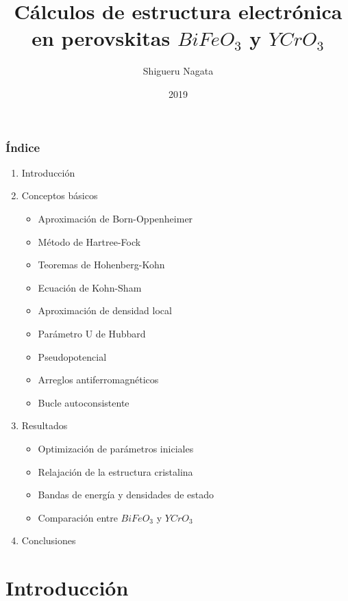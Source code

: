 \documentclass[xcolor=dvipsnames]{beamer}
\author{Shigueru Nagata }
\date{2019}
\title{C\'alculos de estructura electr\'onica en perovskitas $BiFeO_{3}$ y 
$YCrO_{3}$}
\institute{Universidad Nacional de Ingenier\'ia \\ Facultad de ciencias}
\begin{document}
    
    \begin{frame}
        \titlepage
    \end{frame}


\begin{frame}
    \frametitle{\'Indice}
    \begin{multicols}{2}
        \begin{enumerate}
            \item Introducci\'on
            \item Conceptos b\'asicos
                \begin{itemize}
                    \item Aproximaci\'on de Born-Oppenheimer
                    \item M\'etodo de Hartree-Fock
                    \item Teoremas de Hohenberg-Kohn
                    \item Ecuaci\'on de Kohn-Sham
                    \item Aproximaci\'on de densidad local
                    \item Par\'ametro U de Hubbard
                    \item Pseudopotencial
                    \item Arreglos antiferromagn\'eticos
                    \item Bucle autoconsistente
                \end{itemize}
            \item Resultados
                \begin{itemize}
                    \item Optimizaci\'on de par\'ametros iniciales
                    \item Relajaci\'on de la estructura cristalina
                    \item Bandas de energ\'ia y densidades de estado
                    \item Comparaci\'on entre $BiFeO_{3}$ y $YCrO_{3}$
                \end{itemize}
            \item Conclusiones
        \end{enumerate}
    \end{multicols}
\end{frame}

\section{Introducci\'on}

\end{document}
